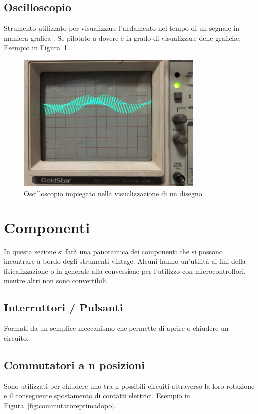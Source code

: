 \documentclass[12pt,a4paper]{report}
\begin{document}
\subsection{Oscilloscopio}
Strumento utilizzato per visualizzare l'andamento nel tempo di un segnale in maniera grafica \cite{itwiki:120862120}. Se pilotato a dovere è in grado di
visualizzare delle grafiche. Esempio in Figura~\ref{fig:oscilloscopio}.

\begin{figure}[h]
  \centering
  \includegraphics[width=0.8\textwidth]{oscilloscopio}
  \caption{Oscilloscopio impiegato nella visualizzazione di un disegno \cite{instructablesoscilloscope}}
  \label{fig:oscilloscopio}
\end{figure}

\section{Componenti}
In questa sezione si farà una panoramica dei componenti che si possono incontrare a bordo degli strumenti vintage. Alcuni hanno
un'utilità ai fini della fisicalizzazione o in generale alla conversione per l'utilizzo con microcontrollori, mentre altri non sono convertibili.



\subsection{Interruttori / Pulsanti}
Formati da un semplice meccanismo che permette di aprire o chiudere un circuito.
\subsection{Commutatori a n posizioni}
Sono utilizzati per chiudere uno tra n possibili circuiti attraverso la loro rotazione e il conseguente spostamento di contatti elettrici.
Esempio in Figura~\ref{fig:commutatoreprimadopo}.
\end{document}
